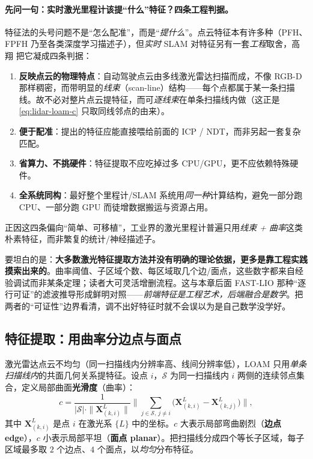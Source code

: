 \paragraph{先问一句：实时激光里程计该提“什么”特征？四条工程判据。}
特征法的头号问题不是“怎么配准”，而是“\emph{提什么}”。点云特征本有许多种（PFH、FPFH 乃至各类深度学习描述子），但\emph{实时} SLAM 对特征另有一套\emph{工程}取舍，高翔\cite{gao2023slamad} 把它凝成四条判据：
\begin{enumerate}
  \item \textbf{反映点云的物理特点}：自动驾驶点云由多线激光雷达扫描而成，不像 RGB-D 那样稠密，而带明显的\emph{线束}（scan-line）结构——每个点都属于某一条扫描线。故不必对整片点云提特征，而可\emph{逐线束}在单条扫描线内做（这正是 \cref{eq:lidar-loam-c} 只取同线邻点的由来）。
  \item \textbf{便于配准}：提出的特征应能直接喂给前面的 ICP / NDT，而非另起一套复杂匹配。
  \item \textbf{省算力、不挑硬件}：特征提取不应吃掉过多 CPU/GPU，更不应依赖特殊硬件。
  \item \textbf{全系统同构}：最好整个里程计/SLAM 系统用\emph{同一种}计算结构，避免一部分跑 CPU、一部分跑 GPU 而徒增数据搬运与资源占用。
\end{enumerate}
正因这四条偏向“简单、可移植”，工业界的激光里程计普遍只用\emph{线束 + 曲率}这类朴素特征，而非繁复的统计/神经描述子。

\begin{insight}\label{ins:lidar-feat-criteria}
要坦白的是：\textbf{大多数激光特征提取方法并没有明确的理论依据，更多是靠工程实践摸索出来的}\cite{gao2023slamad}。曲率阈值、子区域个数、每区域取几个边/面点，这些数字都来自经验调试而非某条定理；读者大可灵活增删流程。这与本章后面 FAST-LIO 那种“逐行可证”的滤波推导形成鲜明对照——\emph{前端特征是工程艺术，后端融合是数学}。把两者的“可证性”边界看清，调不出好特征时就不会误以为是自己数学没学好。
\end{insight}

\subsection{特征提取：用曲率分边点与面点}
\label{sec:lidar-loam-feat}

激光雷达点云不均匀（同一扫描线内分辨率高、线间分辨率低），LOAM 只用\emph{单条扫描线内}的共面几何关系提特征。设点 $i$，$\mathcal{S}$ 为同一扫描线内 $i$ 两侧的连续邻点集合，定义局部曲面\textbf{光滑度}（曲率）\cite{zhang2014loam}：
\begin{equation}
  c=\frac{1}{|\mathcal{S}|\cdot\|\mathbf{X}^L_{(k,i)}\|}\bigg\|\sum_{j\in\mathcal{S},\,j\neq i}\big(\mathbf{X}^L_{(k,i)}-\mathbf{X}^L_{(k,j)}\big)\bigg\|,
  \label{eq:lidar-loam-c}
\end{equation}
其中 $\mathbf{X}^L_{(k,i)}$ 是点 $i$ 在激光系 $\{L\}$ 中的坐标。$c$ 大表示局部弯曲剧烈（\textbf{边点 edge}），$c$ 小表示局部平坦（\textbf{面点 planar}）。把扫描线分成四个等长子区域，每子区域最多取 $2$ 个边点、$4$ 个面点，以\emph{均匀}分布特征。

